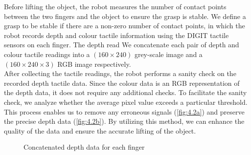 \documentclass[11pt, a4paper]{report}
\begin{document}
Before lifting the object, the robot measures the number of contact points between the two fingers and the object to ensure the grasp is stable. We define a grasp to be stable if there are a non-zero number of contact points, in which the robot records depth and colour tactile information using the DIGIT \cite{Lambeta2020DIGIT} tactile sensors on each finger. The depth read We concatenate each pair of depth and colour tactile readings into a $(160\times240)$ grey-scale image and a $(160\times240\times3)$ RGB image respectively.\\

After collecting the tactile readings, the robot performs a sanity check on the recorded depth tactile data. Since the colour data is an RGB representation of the depth data, it does not require any additional checks. To facilitate the sanity check, we analyze whether the average pixel value exceeds a particular threshold. This process enables us to remove any erroneous signals (\ref{fig:4.2a}) and preserve the precise depth data (\ref{fig:4.2b}). By utilizing this method, we can enhance the quality of the data and ensure the accurate lifting of the object.

\begin{figure}[H]%
    \centering
    \qquad
    \caption{Concatenated depth data for each finger}%
    \label{fig:4.2}%
\end{figure}
\end{document}
